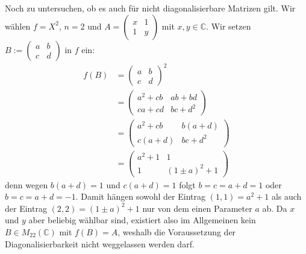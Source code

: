\documentclass[a4paper,12pt]{article}
\begin{document}
Noch zu untersuchen, ob es auch für nicht diagonalisierbare Matrizen gilt. Wir
wählen $f = X^2$, $n = 2$ und $A = \begin{pmatrix} x & 1 \\ 1 & y \end{pmatrix}$
mit $x, y \in \mathbb{C}$. Wir setzen $B := \begin{pmatrix} a & b \\ c & d \end{pmatrix}$
in $f$ ein:
\begin{align*}
  f(B) &= \begin{pmatrix} a & b \\ c & d \end{pmatrix}^2 \\
       &= \begin{pmatrix} a^2 + cb & ab + bd \\ ca + cd & bc + d^2 \end{pmatrix} \\
       &= \begin{pmatrix} a^2 + cb & b(a+d) \\ c(a+d) & bc + d^2 \end{pmatrix} \\
       &= \begin{pmatrix} a^2 + 1 & 1 \\ 1 & (1 \pm a)^2 + 1 \end{pmatrix}
\end{align*}
denn wegen $b(a+d) = 1$ und $c(a+d) = 1$ folgt $b = c = a + d = 1$ oder
$b = c = a + d = -1$. Damit hängen sowohl der Eintrag $(1,1) = a^2 + 1$ als auch
der Eintrag $(2,2) = (1 \pm a)^2 + 1$ nur von dem einen Parameter $a$ ab. Da $x$
und $y$ aber beliebig wählbar sind, existiert also im Allgemeinen kein
$B \in M_{22}(\mathbb{C})$ mit $f(B) = A$, weshalb die Voraussetzung der
Diagonalisierbarkeit nicht weggelassen werden darf.
\end{document}
